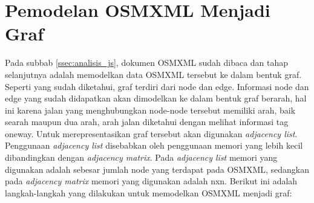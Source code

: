 \section{Pemodelan OSMXML Menjadi Graf} \label{ssec:analisis_graf}
Pada subbab \ref{ssec:analisis_js}, dokumen OSMXML sudah dibaca dan tahap
selanjutnya adalah memodelkan data OSMXML tersebut ke dalam bentuk graf. Seperti
yang sudah diketahui, graf terdiri dari node dan edge. Informasi node dan edge
yang sudah didapatkan akan dimodelkan ke dalam bentuk graf berarah, hal ini
karena jalan yang menghubungkan node-node tersebut memiliki arah, baik searah
maupun dua arah, arah jalan diketahui dengan melihat informasi tag oneway. Untuk
merepresentasikan graf tersebut akan digunakan \textit{adjacency list}.
Penggunaan \textit{adjacency list} disebabkan oleh penggunaan memori yang lebih
kecil dibandingkan dengan \textit{adjacency matrix}. Pada \textit{adjacency
list} memori yang digunakan adalah sebesar jumlah node yang terdapat pada
OSMXML, sedangkan pada \textit{adjacency matrix} memori yang digunakan adalah
nxn. Berikut ini adalah langkah-langkah yang dilakukan untuk memodelkan OSMXML
menjadi graf:
